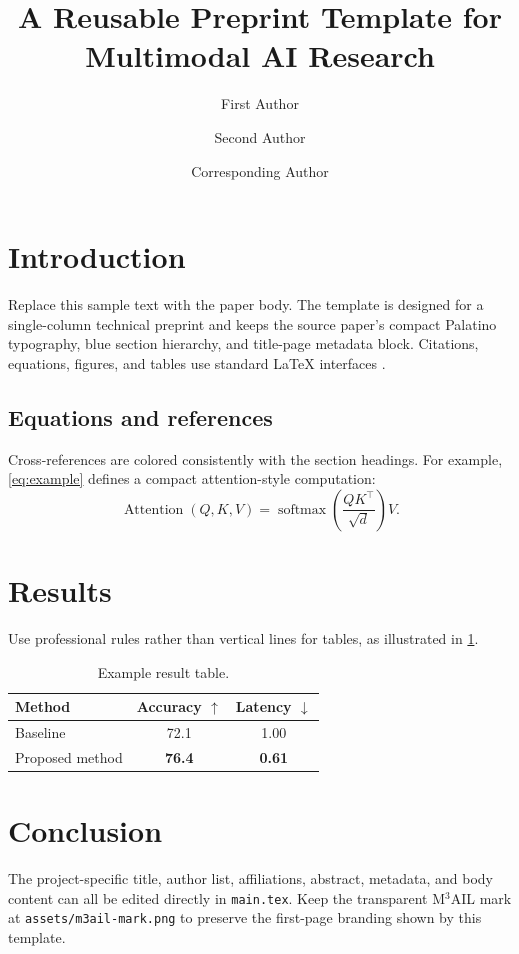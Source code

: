 \documentclass{m3ailpreprint}
\title{A Reusable Preprint Template for Multimodal AI Research}
\author[1,*]{First Author}
\author[1,*]{Second Author}
\author[1,2,\dagger]{Corresponding Author}
\affiliation[1]{M$^3$AIL Research Group}
\affiliation[2]{Partner Institution}
\begin{document}
\maketitle

\section{Introduction}
\label{sec:introduction}

Replace this sample text with the paper body. The template is designed for a
single-column technical preprint and keeps the source paper's compact Palatino
typography, blue section hierarchy, and title-page metadata block. Citations,
equations, figures, and tables use standard LaTeX interfaces
\citep{vaswani2017attention}.

\subsection{Equations and references}

Cross-references are colored consistently with the section headings. For
example, \cref{eq:example} defines a compact attention-style computation:
\begin{equation}
  \operatorname{Attention}(Q,K,V)
  = \operatorname{softmax}\!\left(\frac{QK^\top}{\sqrt{d}}\right)V.
  \label{eq:example}
\end{equation}

\section{Results}

Use professional rules rather than vertical lines for tables, as illustrated
in \cref{tab:example}.

\begin{table}[ht]
  \centering
  \caption{Example result table.}
  \label{tab:example}
  \begin{tabular}{lcc}
    \toprule
    Method & Accuracy $\uparrow$ & Latency $\downarrow$ \\
    \midrule
    Baseline & 72.1 & 1.00 \\
    Proposed method & \textbf{76.4} & \textbf{0.61} \\
    \bottomrule
  \end{tabular}
\end{table}

\section{Conclusion}

The project-specific title, author list, affiliations, abstract, metadata, and
body content can all be edited directly in \texttt{main.tex}. Keep the
transparent M$^3$AIL mark at \texttt{assets/m3ail-mark.png} to preserve the
first-page branding shown by this template.



\end{document}
